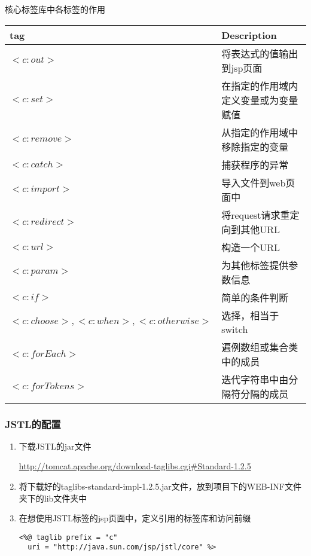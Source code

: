 \documentclass{beamer}
\begin{document}
\begin{frame}{核心标签库中各标签的作用}
\begin{table}
\begin{tabular}{p{10em}l}
\toprule
\textbf{tag}&\textbf{Description}\\
\midrule
$<c:out>$&将表达式的值输出到jsp页面\\
$<c:set>$&在指定的作用域内定义变量或为变量赋值\\
$<c:remove>$&从指定的作用域中移除指定的变量\\
$<c:catch>$&捕获程序的异常\\
$<c:import>$&导入文件到web页面中\\
$<c:redirect>$&将request请求重定向到其他URL\\
$<c:url>$&构造一个URL\\
$<c:param>$&为其他标签提供参数信息\\
$<c:if>$&简单的条件判断\\
$<c:choose>, <c:when>, <c:otherwise>$&选择，相当于switch\\
$<c:forEach>$&遍例数组或集合类中的成员\\
$<c:forTokens>$&迭代字符串中由分隔符分隔的成员\\
\bottomrule
\end{tabular}
\end{table}
\end{frame}
\begin{frame}[fragile]
\frametitle{JSTL的配置}
\begin{enumerate}
\item
下载JSTL的jar文件

\url{http://tomcat.apache.org/download-taglibs.cgi#Standard-1.2.5}
\item
将下载好的taglibs-standard-impl-1.2.5.jar文件，放到项目下的WEB-INF文件夹下的lib文件夹中
\item
在想使用JSTL标签的jsp页面中，定义引用的标签库和访问前缀
\begin{lstlisting}
<%@ taglib prefix = "c" 
  uri = "http://java.sun.com/jsp/jstl/core" %>
\end{lstlisting}
\end{enumerate}
\end{frame}
\end{document}
